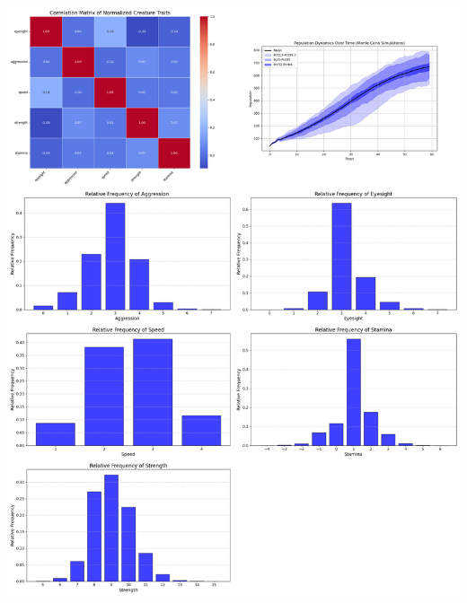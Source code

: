 \documentclass{article}
\begin{document}
\begin{center}
    \includegraphics[scale=0.21]{tests/1.7.jpg}
\end{center}
\end{document}
